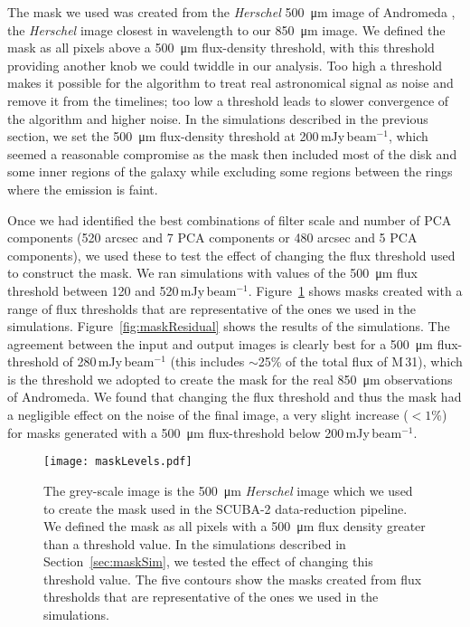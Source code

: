 \documentclass[a4paper,fleqn,usenatbib, twocolumn]{aastex63}
\begin{document}
The mask we used was created from the {\it Herschel} \SI{500}{\micro\meter} image of Andromeda
\citep{smith2012}, the {\it Herschel} image closest in wavelength to
our  \SI{850}{\micro\meter} image. We defined the mask as all pixels above a
\SI{500}{\micro\meter} flux-density threshold, with this threshold providing another knob we could
twiddle in our analysis. Too high a threshold makes it possible for
the algorithm to treat real astronomical signal as noise and remove
it from the timelines; too low a threshold leads to slower convergence of the algorithm
and higher noise.
In the simulations described in the
previous section, we set the \SI{500}{\micro\meter} flux-density threshold at 200\,mJy\,beam$^{-1}$, which
seemed a reasonable compromise as the mask
then included most of the disk and some inner regions of the galaxy while
excluding some regions between the rings where the emission is faint.

Once we had identified the best combinations of filter scale and
number of PCA components (520 arcsec and 7 PCA components or 480
arcsec and 5 PCA components), we used these to test the effect of
changing the flux threshold used to construct the mask. We ran simulations
with values of the \SI{500}{\micro\meter} flux threshold between 120 and 520\,mJy\,beam$^{-1}$.
Figure~\ref{fig:maskLevels} shows masks created 
with a range of flux thresholds that are representative of the ones we
used in the simulations.
Figure~\ref{fig:maskResidual} shows the results of the simulations. The agreement
between the input and output images is clearly best for
a \SI{500}{\micro\meter} flux-threshold of 280\,mJy\,beam$^{-1}$ (this includes $\sim$25\% of the total
flux of M\,31),
which is the threshold we adopted to create the mask for the
real \SI{850}{\micro\meter} observations of Andromeda. We found that changing the
flux threshold and thus the mask had a negligible effect on the
noise of the final image, a very slight increase ($<1$\%) for masks generated
with a \SI{500}{\micro\meter} flux-threshold below 200\,mJy\,beam$^{-1}$.

\begin{figure}
  \centering
  \texttt{[image: maskLevels.pdf]}
  \caption{The grey-scale image is the \SI{500}{\micro\meter} {\it Herschel} image 
  which we used to create the mask used in the SCUBA-2 data-reduction pipeline. We
  defined the mask as all pixels with a \SI{500}{\micro\meter} flux density greater
  than a threshold value. In the simulations described in Section~\ref{sec:maskSim}, we
  tested the effect of changing this threshold value. The five contours
  show the masks created from flux thresholds that are representative of the
  ones we used in the simulations.
  }
  \label{fig:maskLevels}
\end{figure}
\end{document}
